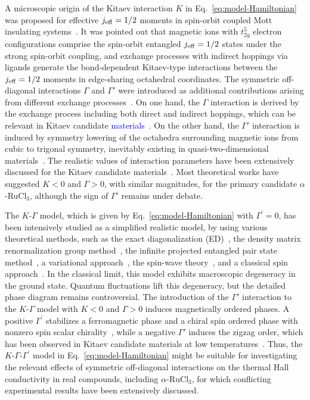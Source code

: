 \documentclass[twocolumn,superscriptaddress,showpacs, longbibliography, aps, prx]{revtex4-2}
\newcommand{\blue}[1]{\textcolor{blue}{#1}}
\begin{document}
A microscopic origin of the Kitaev interaction $K$ in Eq.~\eqref{eq:model-Hamiltonian} was proposed for effective $j_{\rm eff}=1/2$ moments in spin-orbit coupled Mott insulating systems~\cite{Jackeli_PRL2009}. 
It was pointed out that magnetic ions with $t_{2g}^5$ electron configurations comprise the spin-orbit entangled $j_{\rm eff}=1/2$ states under the strong spin-orbit coupling, and exchange processes with indirect hoppings via ligands generate the bond-dependent Kitaev-type interactions between the $j_{\rm eff}=1/2$ moments in edge-sharing octahedral coordinates. 
The symmetric off-diagonal interactions $\Gamma$ and $\Gamma'$ were introduced as additional contributions arising from different exchange processes~\cite{Rau2014}. 
On one hand, the $\Gamma$ interaction is derived by the exchange process including both direct and indirect hoppings, which can be relevant in Kitaev candidate \blue{materials~\cite{Yamaji2014,Winter2016,WinterTDBSGV2017,OkuboSYKSTI2017}}. 
On the other hand, the $\Gamma'$ interaction is induced by symmetry lowering of the octahedra surrounding magnetic ions from cubic to trigonal symmetry, inevitably existing in quasi-two-dimensional materials~\cite{Rau2014}.
The realistic values of interaction parameters have been extensively discussed for the Kitaev candidate materials~\cite{Yamaji2016,Suzuki2018,laurell2020dynamical,Maksimov2020}.
Most theoretical works have suggested $K<0$ and $\Gamma>0$, with similar magnitudes, for the primary candidate $\alpha$-RuCl$_3$, although the sign of $\Gamma'$ remains under debate.

The $K$-$\Gamma$ model, which is given by Eq.~\eqref{eq:model-Hamiltonian} with $\Gamma^\prime=0$, has been intensively studied as a simplified realistic model, by using various theoretical methods, such as the exact diagonalization (ED)~\cite{catuneanu2018,Yamada2020}, the density matrix renormalization group method~\cite{Gohlke_PRB2018}, the infinite projected entangled pair state method~\cite{Lee_NCom2020,ZhangLLLW2023}, a variational approach~\cite{Zhang2021}, the spin-wave theory~\cite{Smit2020}, and a classical spin approach~\cite{Rayyan2021}.
In the classical limit, this model exhibits macroscopic degeneracy in the ground state. 
Quantum fluctuations lift this degeneracy, but the detailed phase diagram remains controversial.
The introduction of the $\Gamma'$ interaction to the $K$-$\Gamma$ model with $K<0$ and $\Gamma>0$ induces magnetically ordered phases. 
A positive $\Gamma^\prime$ stabilizes a ferromagnetic phase and a chiral spin ordered phase with nonzero spin scalar chirality~\cite{Luo2022PRR,Luo2022}, 
while a negative $\Gamma'$ induces the zigzag order, which has been observed in Kitaev candidate materials at low temperatures~\cite{Rusna2019,gordon2019theory,Chern2020,Lee_NCom2020}. 
Thus, the $K$-$\Gamma$-$\Gamma^\prime$ model in Eq.~\eqref{eq:model-Hamiltonian} might be suitable for investigating the relevant effects of symmetric off-diagonal interactions on the thermal Hall conductivity in real compounds, including $\alpha$-$\mathrm{RuCl_3}$, for which conflicting experimental results have been extensively discussed.
\end{document}
